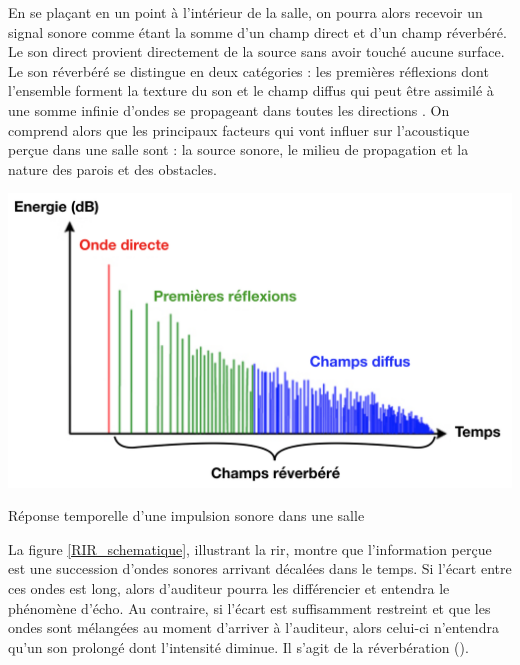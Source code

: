 En se plaçant en un point à l'intérieur de la salle, on pourra alors recevoir un signal sonore comme étant la somme d'un champ direct et d’un champ réverbéré. Le son direct provient directement de la source sans avoir touché aucune surface. Le son réverbéré se distingue en deux catégories : les premières réflexions dont l'ensemble forment la texture du son et le champ diffus qui peut être assimilé à une somme infinie d'ondes se propageant dans toutes les directions \cite[p. 9]{jouhaneau}.
On comprend alors que les principaux facteurs qui vont influer sur l'acoustique perçue dans une salle sont : la source sonore, le milieu de propagation et la nature des parois et des obstacles.

\begin{figureth}
	\includegraphics[width=\linewidth]{images/RIR_schematique}
	\caption{Réponse temporelle d'une impulsion sonore dans une salle}
	\label{RIR_schematique}
\end{figureth}

La figure \ref{RIR_schematique}, illustrant la \gls{rir}, montre que l'information perçue est une succession d'ondes sonores arrivant décalées dans le temps. Si l'écart entre ces ondes est long, alors d'auditeur pourra les différencier et entendra le phénomène d'écho. Au contraire, si l'écart est suffisamment restreint et que les ondes sont mélangées au moment d'arriver à l'auditeur, alors celui-ci n'entendra qu'un son prolongé dont l'intensité diminue. Il s'agit de la réverbération (\cite[p. 39]{sabine}). 

